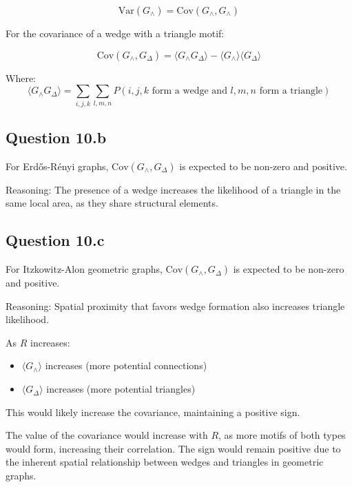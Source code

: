 \documentclass{article}
\begin{document}
\[
\text{Var}(G_{\wedge}) = \text{Cov}(G_{\wedge}, G_{\wedge})
\]

For the covariance of a wedge with a triangle motif:

\[
\text{Cov}(G_{\wedge}, G_{\Delta}) = \langle G_{\wedge} G_{\Delta} \rangle - \langle G_{\wedge} \rangle \langle G_{\Delta} \rangle
\]

Where:
\[
\langle G_{\wedge} G_{\Delta} \rangle = \sum_{i,j,k} \sum_{l,m,n} P(i,j,k \text{ form a wedge and } l,m,n \text{ form a triangle})
\]

\subsection{Question 10.b}

For Erdős-Rényi graphs, \(\text{Cov}(G_{\wedge}, G_{\Delta})\) is expected to be non-zero and positive.

Reasoning: The presence of a wedge increases the likelihood of a triangle in the same local area, as they share structural elements.

\subsection{Question 10.c}

For Itzkowitz-Alon geometric graphs, \(\text{Cov}(G_{\wedge}, G_{\Delta})\) is expected to be non-zero and positive.

Reasoning: Spatial proximity that favors wedge formation also increases triangle likelihood.

As \( R \) increases:
\begin{itemize}
\item \( \langle G_{\wedge} \rangle \) increases (more potential connections)
\item \( \langle G_{\Delta} \rangle \) increases (more potential triangles)
\end{itemize}

This would likely increase the covariance, maintaining a positive sign.

The value of the covariance would increase with \( R \), as more motifs of both types would form, increasing their correlation. The sign would remain positive due to the inherent spatial relationship between wedges and triangles in geometric graphs.
\end{document}
